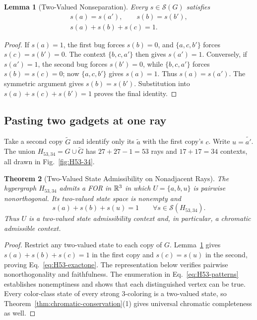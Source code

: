 \documentclass[aps,pra,reprint,superscriptaddress,longbibliography,nofootinbib,floatfix,10pt]{revtex4-2}
\newtheorem{theorem}{Theorem}
\newtheorem{lemma}[theorem]{Lemma}
\theoremstyle{definition}\newtheorem{definition}[theorem]{Definition}
\theoremstyle{remark}\newtheorem{remark}[theorem]{Remark}
\newcommand{\Sc}{\mathcal S}\newcommand{\Cc}{\mathcal C}\newcommand{\Wc}{\mathcal W}
\begin{document}
\begin{lemma}[Two-Valued Nonseparation]\label{lem:H53-nonseparation}
Every $s\in\Sc(G)$ satisfies
\begin{equation}\label{eq:H53-nonseparation}
\begin{gathered}
s(a)=s(a'),\qquad s(b)=s(b'),\\
s(a)+s(b)+s(c)=1.
\end{gathered}
\end{equation}
\end{lemma}
\begin{proof}
If $s(a)=1$, the first bug forces $s(b)=0$, and $\{a,c,b'\}$ forces $s(c)=s(b')=0$. The context $\{b,c,a'\}$ then gives $s(a')=1$. Conversely, if $s(a')=1$, the second bug forces $s(b')=0$, while $\{b,c,a'\}$ forces $s(b)=s(c)=0$; now $\{a,c,b'\}$ gives $s(a)=1$. Thus $s(a)=s(a')$. The symmetric argument gives $s(b)=s(b')$. Substitution into $s(a)+s(c)+s(b')=1$ proves the final identity.
\end{proof}

\subsection{Pasting two gadgets at one ray}

Take a second copy $\widetilde G$ and identify only its $\widetilde a$ with the first copy's $c$. Write $u=\widetilde{a'}$. The union $H_{53,34}=G\cup\widetilde G$ has $27+27-1=53$ rays and $17+17=34$ contexts, all drawn in Fig.~\ref{fig:H53-34}.

\begin{theorem}[Two-Valued State Admissibility on Nonadjacent Rays]\label{thm:H53-two-valued}
The hypergraph $H_{53,34}$ admits a FOR in $\mathbb R^3$ in which $U=\{a,b,u\}$ is pairwise nonorthogonal. Its two-valued state space is nonempty and
\begin{equation}\label{eq:H53-exactone}
s(a)+s(b)+s(u)=1\qquad\forall s\in\Sc(H_{53,34}).
\end{equation}
Thus $U$ is a two-valued state admissibility context and, in particular, a chromatic admissible context.
\end{theorem}
\begin{proof}
Restrict any two-valued state to each copy of $G$. Lemma~\ref{lem:H53-nonseparation} gives $s(a)+s(b)+s(c)=1$ in the first copy and $s(c)=s(u)$ in the second, proving Eq.~\eqref{eq:H53-exactone}. The representation below verifies pairwise nonorthogonality and faithfulness. The enumeration in Eq.~\eqref{eq:H53-patterns} establishes nonemptiness and shows that each distinguished vertex can be true. Every color-class state of every strong $3$-coloring is a two-valued state, so Theorem~\ref{thm:chromatic-conservation}(1) gives universal chromatic completeness as well.
\end{proof}
\end{document}
